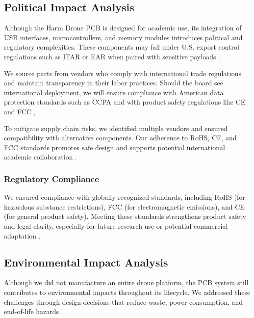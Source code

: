 \documentclass[12pt]{article}
\begin{document}
\subsection{Political Impact Analysis}

\par Although the Harm Drone PCB is designed for academic use, its integration of USB interfaces, microcontrollers, and memory modules introduces political and regulatory complexities. These components may fall under U.S. export control regulations such as ITAR or EAR when paired with sensitive payloads \cite{ear}.

\par We source parts from vendors who comply with international trade regulations and maintain transparency in their labor practices. Should the board see international deployment, we will ensure compliance with American data protection standards such as CCPA and with product safety regulations like CE and FCC \cite{rohs}, \cite{ccpa}.

\par To mitigate supply chain risks, we identified multiple vendors and ensured compatibility with alternative components. Our adherence to RoHS, CE, and FCC standards promotes safe design and supports potential international academic collaboration \cite{rohs}.

\subsubsection{Regulatory Compliance}

\par We ensured compliance with globally recognized standards, including RoHS (for hazardous substance restrictions), FCC (for electromagnetic emissions), and CE (for general product safety). Meeting these standards strengthens product safety and legal clarity, especially for future research use or potential commercial adaptation \cite{rohs}.

\subsection{Environmental Impact Analysis}

\par Although we did not manufacture an entire drone platform, the PCB system still contributes to environmental impacts throughout its lifecycle. We addressed these challenges through design decisions that reduce waste, power consumption, and end-of-life hazards.
\end{document}
